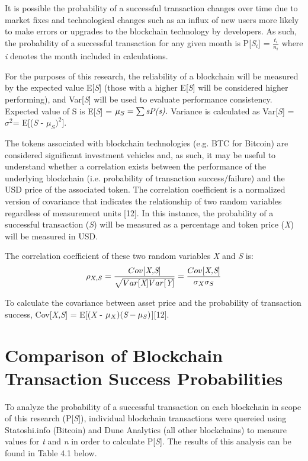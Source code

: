 \documentclass[12pt]{article}
\begin{document}
It is possible the probability of a successful transaction changes over time due to market fixes and technological changes such as an influx of new users more likely to make errors or upgrades to the blockchain technology by developers. As such, the probability of a successful transaction for any given month is P[\emph{S$_{i}$}] = \(\frac{t_{i}}{n_{i}}\) where \emph{i} denotes the month included in calculations. 

For the purposes of this research, the reliability of a blockchain will be measured by the expected value E[\emph{S}] (those with a higher E[\emph{S}] will be considered higher performing), and Var[\emph{S}] will be used to evaluate performance consistency. Expected value of S is E[\emph{S}] = $\mu_{S} = \sum \emph{sP(s)}.$ Variance is calculated as Var[\emph{S}] = $\sigma^{2}$= E[(\emph{S} - $\mu_{S})^2$].

The tokens associated with blockchain technologies (e.g. BTC for Bitcoin) are considered significant investment vehicles and, as such, it may be useful to understand whether a correlation exists between the performance of the underlying blockchain (i.e. probability of transaction success/failure) and the USD price of the associated token. The correlation coefficient is a normalized version of covariance that indicates the relationship of two random variables regardless of measurement units [12]. In this instance, the probability of a successful transaction (\emph{S}) will be measured as a percentage and token price (\emph{X}) will be measured in USD.

The correlation coefficient of these two random variables \emph{X} and \emph{S} is:
\[
\rho_{X,S} = \frac{Cov[\emph{X,S}]}{\sqrt{Var[\emph{X}]Var[\emph{Y}]}}=\frac{Cov[\emph{X,S}]}{\sigma_{X}\sigma_{S}}
\]

To calculate the covariance between asset price and the probability of transaction success, Cov[\emph{X,S}] = E[(\emph{X} - $\mu_{X})(\emph{S} - \mu_{S})$][12].

\section{Comparison of Blockchain Transaction Success Probabilities}
To analyze the probability of a successful transaction on each blockchain in scope of this research (P[\emph{S}]), individual blockchain transactions were quereied using Statoshi.info (Bitcoin) and Dune Analytics (all other blockchains) to measure values for \emph{t} and \emph{n} in order to calculate P[\emph{S}]. The results of this analysis can be found in Table 4.1 below.\\
\end{document}
